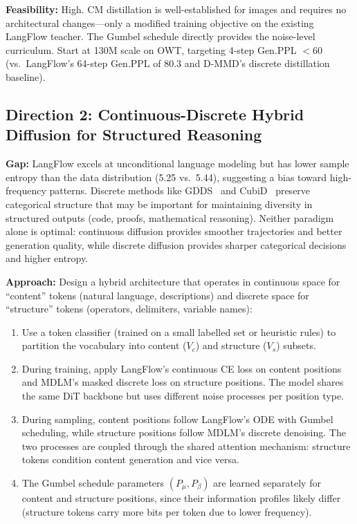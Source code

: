\documentclass[11pt]{article}
\begin{document}
\textbf{Feasibility:} High. CM distillation is well-established for images and requires no architectural changes---only a modified training objective on the existing LangFlow teacher. The Gumbel schedule directly provides the noise-level curriculum. Start at 130M scale on OWT, targeting 4-step Gen.PPL $< 60$ (vs.\ LangFlow's 64-step Gen.PPL of 80.3 and D-MMD's discrete distillation baseline).

\subsection{Direction 2: Continuous-Discrete Hybrid Diffusion for Structured Reasoning}

\textbf{Gap:} LangFlow excels at unconditional language modeling but has lower sample entropy than the data distribution (5.25 vs.\ 5.44), suggesting a bias toward high-frequency patterns. Discrete methods like GDDS~\cite{gdds} and CubiD~\cite{cubid} preserve categorical structure that may be important for maintaining diversity in structured outputs (code, proofs, mathematical reasoning). Neither paradigm alone is optimal: continuous diffusion provides smoother trajectories and better generation quality, while discrete diffusion provides sharper categorical decisions and higher entropy.

\textbf{Approach:} Design a hybrid architecture that operates in continuous space for ``content'' tokens (natural language, descriptions) and discrete space for ``structure'' tokens (operators, delimiters, variable names):
\begin{enumerate}
    \item Use a token classifier (trained on a small labelled set or heuristic rules) to partition the vocabulary into content ($V_c$) and structure ($V_s$) subsets.

    \item During training, apply LangFlow's continuous CE loss on content positions and MDLM's masked discrete loss on structure positions. The model shares the same DiT backbone but uses different noise processes per position type.

    \item During sampling, content positions follow LangFlow's ODE with Gumbel scheduling, while structure positions follow MDLM's discrete denoising. The two processes are coupled through the shared attention mechanism: structure tokens condition content generation and vice versa.

    \item The Gumbel schedule parameters $(P_\mu, P_\beta)$ are learned separately for content and structure positions, since their information profiles likely differ (structure tokens carry more bits per token due to lower frequency).
\end{enumerate}
\end{document}
